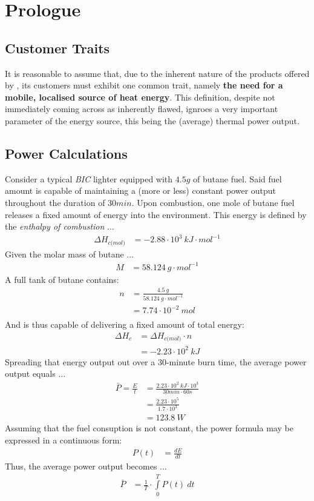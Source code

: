 \section{Prologue}
\subsection{Customer Traits}
It is reasonable to assume that, due to the inherent nature of the products offered by \fw, its customers must
exhibit one common trait, namely \textbf{the need for a mobile, localised source of heat energy}.
This definition, despite not immediately coming across as inherently flawed, ignroes a very important parameter of the
energy source, this being the (average) thermal power output. \\[\baselineskip]
\subsection{Power Calculations}
Consider a typical \textit{BIC} lighter equipped with $4.5g$ of butane fuel. Said fuel amount is capable of maintaining
a (more or less) constant power output throughout the duration of $30min$.
Upon combustion, one mole of butane fuel releases a fixed amount of energy into the environment. This energy is defined
by the \textit{enthalpy of combustion} $\dots$
\begin{align*}
	\Delta H_{c\textit{(mol)}} &= -2.88 \cdot 10^3 \: kJ \cdot mol^{-1}
\end{align*}
Given the molar mass of butane $\dots$
\begin{align*}
	M &= 58.124 \: g \cdot mol^{-1}
\end{align*}
A full tank of butane contains:
\begin{align*}
	n &= \frac{4.5 \: g}{58.124 \: g \cdot mol^{-1}} \\
	  &= 7.74 \cdot 10^{-2} \: mol \\
\end{align*}
And is thus capable of delivering a fixed amount of total energy:
\begin{align*}
	\Delta H_c &= \Delta H_{c\textit{(mol)}} \cdot n \\
		   &= -2.23 \cdot 10^2 \: kJ
\end{align*}
Spreading that energy output out over a $30$-minute burn time, the average power output equals $\dots$
\begin{align*}
	\bar{P} = \frac{E}{t} &= \frac{2.23 \cdot 10^2 \: kJ \cdot 10^3}{30min \cdot 60s} \\
			&= \frac{2.23 \cdot 10^5}{1.7 \cdot 10^3} \\
			&= 123.8 \: W
\end{align*}
Assuming that the fuel consuption is not constant, the power formula may be expressed in a continuous form:
\begin{align*}
	P(t) &= \frac{dE}{dt}
\end{align*}
Thus, the average power output becomes $\dots$
\begin{align*}
	\bar{P} &= \frac{1}{T} \cdot \int\limits_{0}^{T} P(t) \: dt
\end{align*}
